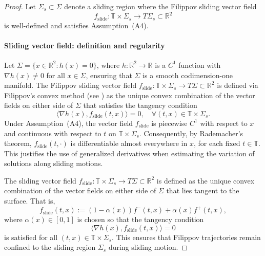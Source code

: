 \documentclass[11pt]{article}
\begin{document}
\begin{proof}
Let \( \Sigma_s \subset \Sigma \) denote a sliding region where the Filippov sliding vector field
\begin{equation} \label{eq:f_slide_def}
	f_{\mathrm{slide}} : \mathbb{T} \times \Sigma_s \to T\Sigma_s \subset \mathbb{R}^2
\end{equation}
is well-defined and satisfies Assumption~(A4).

\paragraph{Sliding vector field: definition and regularity}

Let \( \Sigma = \{ x \in \mathbb{R}^2 : h(x) = 0 \} \), where \( h : \mathbb{R}^2 \to \mathbb{R} \) is a \( C^1 \) function with \( \nabla h(x) \neq 0 \) for all \( x \in \Sigma \), ensuring that \( \Sigma \) is a smooth codimension-one manifold. The Filippov sliding vector field \( f_{\mathrm{slide}} \colon \mathbb{T} \times \Sigma_s \to T\Sigma \subset \mathbb{R}^2 \) is defined via Filippov’s convex method (see \cite{filippov1988}) as the unique convex combination of the vector fields on either side of \( \Sigma \) that satisfies the tangency condition
\begin{equation} \label{eq:sliding_tangency}
	\langle \nabla h(x), f_{\mathrm{slide}}(t,x) \rangle = 0, \quad \forall (t,x) \in \mathbb{T} \times \Sigma_s.
\end{equation}
Under Assumption~(A4), the vector field \( f_{\mathrm{slide}} \) is piecewise \( C^1 \) with respect to \( x \) and continuous with respect to \( t \) on \( \mathbb{T} \times \Sigma_s \). Consequently, by Rademacher’s theorem, \( f_{\mathrm{slide}}(t, \cdot) \) is differentiable almost everywhere in \( x \), for each fixed \( t \in \mathbb{T} \). This justifies the use of generalized derivatives when estimating the variation of solutions along sliding motions.

The sliding vector field \( f_{\mathrm{slide}} : \mathbb{T} \times \Sigma_s \to T\Sigma \subset \mathbb{R}^2 \) is defined as the unique convex combination of the vector fields on either side of \( \Sigma \) that lies tangent to the surface. That is,
\[
f_{\mathrm{slide}}(t,x) := (1 - \alpha(x)) f^-(t,x) + \alpha(x) f^+(t,x),
\]
where \( \alpha(x) \in [0,1] \) is chosen so that the tangency condition
\[
\langle \nabla h(x), f_{\mathrm{slide}}(t,x) \rangle = 0
\]
is satisfied for all \( (t,x) \in \mathbb{T} \times \Sigma_s \). This ensures that Filippov trajectories remain confined to the sliding region \( \Sigma_s \) during sliding motion.






\end{proof}
\end{document}
